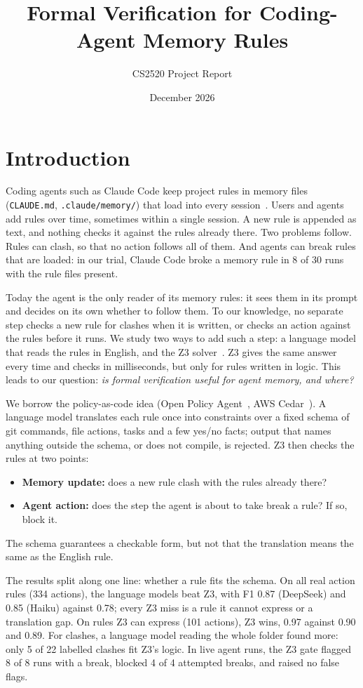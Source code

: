 \documentclass[11pt]{article}
\title{Formal Verification for Coding-Agent Memory Rules}
\author{CS2520 Project Report}
\date{December 2026}
\begin{document}
\maketitle

\section{Introduction}

Coding agents such as Claude Code keep project rules in memory files (\texttt{CLAUDE.md},
\texttt{.claude/memory/}) that load into every session~\cite{claudecode-memory}. Users and agents
add rules over time, sometimes within a single session. A new rule is appended as text, and
nothing checks it against the rules already there. Two problems follow. Rules can clash, so that
no action follows all of them. And agents can break rules that are loaded: in our trial, Claude
Code broke a memory rule in 8 of 30 runs with the rule files present.

Today the agent is the only reader of its memory rules: it sees them in its prompt and decides on
its own whether to follow them. To our knowledge, no separate step checks a new rule for clashes
when it is written, or checks an action against the rules before it runs. We study two ways to add
such a step: a language model that reads the rules in English, and the Z3
solver~\cite{z3}. Z3 gives the same answer every time and checks in milliseconds, but only for
rules written in logic. This leads to our question: \emph{is formal verification useful for agent
memory, and where?}

We borrow the policy-as-code idea (Open Policy Agent~\cite{opa}, AWS Cedar~\cite{cedar}). A
language model translates each rule once into constraints over a fixed schema of git commands,
file actions, tasks and a few yes/no facts; output that names anything outside the schema, or does
not compile, is rejected. Z3 then checks the rules at two points:
\begin{itemize}
  \item \textbf{Memory update:} does a new rule clash with the rules already there?
  \item \textbf{Agent action:} does the step the agent is about to take break a rule? If so, block it.
\end{itemize}
The schema guarantees a checkable form, but not that the translation means the same as the English
rule.

The results split along one line: whether a rule fits the schema. On all real action rules (334
actions), the language models beat Z3, with F1 0.87 (DeepSeek) and 0.85 (Haiku) against 0.78;
every Z3 miss is a rule it cannot express or a translation gap. On rules Z3 can express (101
actions), Z3 wins, 0.97 against 0.90 and 0.89. For clashes, a language model reading the whole
folder found more: only 5 of 22 labelled clashes fit Z3's logic. In live agent runs, the Z3 gate
flagged 8 of 8 runs with a break, blocked 4 of 4 attempted breaks, and raised no false flags.
\end{document}

